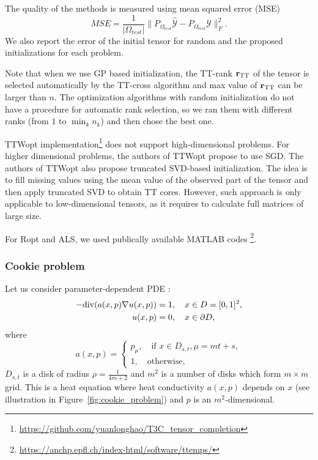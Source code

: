 The quality of the methods is measured using mean squared error (MSE)
\[
    MSE = \frac{1}{|\Omega_{test}|}\|P_{\Omega_{test}} \widehat{\mathcal{Y}} - P_{\Omega_{test}}\mathcal{Y} \|_F^2.
\]
We also report the error of the initial tensor for random and the proposed initializations for each problem.

Note that when we use GP based initialization, the TT-rank
$\mathbf{r}_{{\rm TT}}$ of the tensor is selected automatically by the TT-cross algorithm and max value of $\mathbf{r}_{{\rm TT}}$ can be larger than $n$.
The optimization algorithms with random initialization do not have a procedure for automatic rank selection, so we ran them with different ranks (from $1$ to $\min_{k}{n_k}$) and then chose the best one.

TTWopt implementation\footnote{\url{https://github.com/yuanlonghao/T3C_tensor_completion}} does not support high-dimensional problems.
For higher dimensional problems, the authors of TTWopt propose to use SGD.
The authors of TTWopt also propose truncated SVD-based initialization.
The idea is to fill missing values using the mean value of the
observed part of the tensor and then apply truncated SVD
to obtain TT cores.
However, such approach is only applicable to low-dimensional
tensors, as it requires to calculate full matrices of large
size.

For Ropt and ALS, we used publically available MATLAB codes
\footnote{\url{https://anchp.epfl.ch/index-html/software/ttemps/}}.


\subsubsection{Cookie problem}
\label{sec:cookie_problem}
Let us consider parameter-dependent PDE
\citep{ballani2015hierarchical, tobler2012low}:
\begin{align*}
    -{\rm div} (a(x, p) \nabla u(x, p)) &= 1, \quad x \in D = [0, 1]^2, \\
    u(x, p) &= 0, \quad x \in \partial D,
\end{align*}
where
\[
a(x, p) = \begin{cases}
p_\mu, \quad \mbox{if } x\in D_{s, t}, \mu = mt + s, \\
1, \quad \mbox{otherwise},
\end{cases}
\]
$D_{s, t}$ is a disk of radius $\rho=\frac{1}{4m + 2}$
and $m^2$ is a number of disks which form $m \times m$ grid.
This is a heat equation where heat conductivity $a(x, p)$ depends on $x$
(see illustration in Figure~\ref{fig:cookie_problem}) and $p$ is an $m^2$-dimensional.

